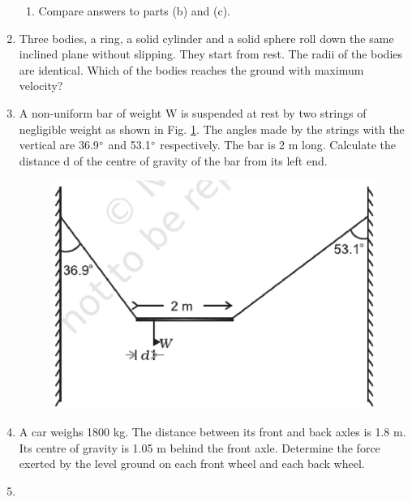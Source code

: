 \begin{enumerate}[label=\arabic*.,ref=\thesubsection.\theenumi]
\begin{enumerate}[label=(\alph*)]
\item  Compare answers to parts (b) and (c).
\end{enumerate}
\item Three bodies, a ring, a solid cylinder and a solid sphere roll down the same inclined plane without slipping. They start from rest. The radii of the bodies are identical. Which of the bodies reaches the ground with maximum velocity?

\item A non-uniform bar of weight W is suspended at rest by two strings of negligible weight as shown in Fig. \ref{fig:7.39}. The angles made by the strings with the vertical are 36.9$\degree$ and 53.1$\degree$ respectively. The bar is 2 m long. Calculate the distance d of the centre of gravity of the bar from its left end.
\begin{figure}[!ht]
\includegraphics[width=\columnwidth]{./figs/11-1/7/7.39.eps}
\caption{}
\label{fig:7.39}
\end{figure}
\item A car weighs 1800 kg. The distance between its front and back axles is 1.8 m. Its centre of gravity is 1.05 m behind the front axle. Determine the force exerted by the level ground on each front wheel and each back wheel.
\item 
\begin{enumerate}[label=(\alph*)]

\end{enumerate}
\end{enumerate}
